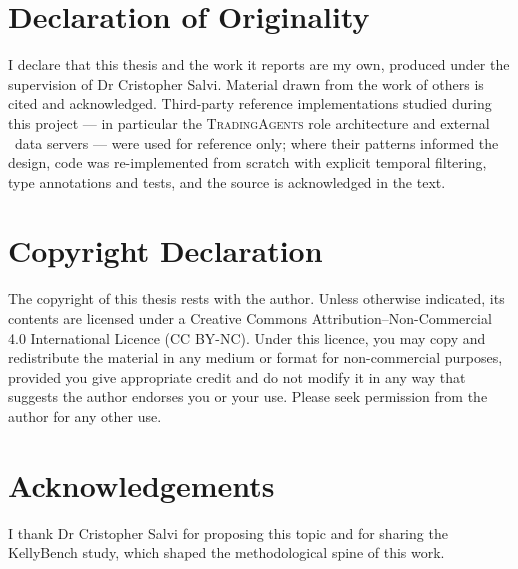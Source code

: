 \chapter*{Declaration of Originality}

I declare that this thesis and the work it reports are my own, produced under the
supervision of Dr Cristopher Salvi. Material drawn from the work of others is cited and
acknowledged. Third-party reference implementations studied during this project --- in
particular the \textsc{TradingAgents} role architecture and external \mcp\ data servers
--- were used for reference only; where their patterns informed the design, code was
re-implemented from scratch with explicit temporal filtering, type annotations and tests,
and the source is acknowledged in the text.

\vspace{1.0cm}
\chapter*{Copyright Declaration}

The copyright of this thesis rests with the author. Unless otherwise indicated, its
contents are licensed under a Creative Commons Attribution--Non-Commercial 4.0
International Licence (CC BY-NC). Under this licence, you may copy and redistribute the
material in any medium or format for non-commercial purposes, provided you give
appropriate credit and do not modify it in any way that suggests the author endorses you
or your use. Please seek permission from the author for any other use.

\vspace{1.0cm}
\chapter*{Acknowledgements}

I thank Dr Cristopher Salvi for proposing this topic and for sharing the KellyBench study,
which shaped the methodological spine of this work.
